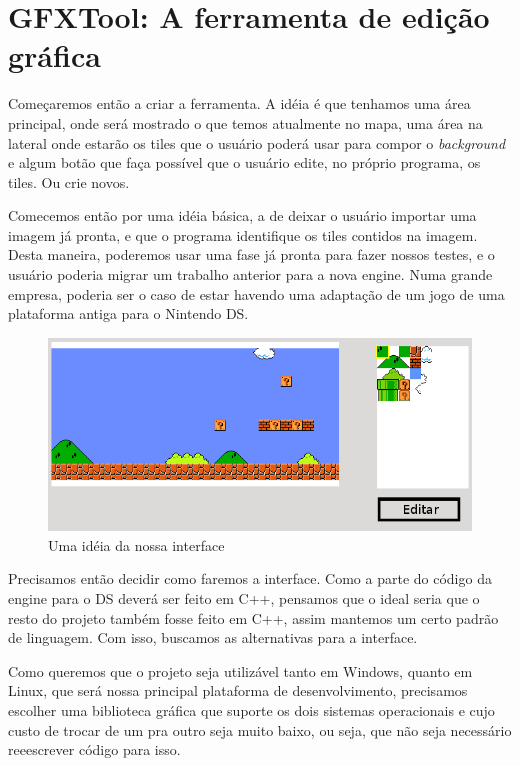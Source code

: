 \documentclass[brazil]{abnt}
\begin{document}
\section{GFXTool: A ferramenta de edição gráfica}
Começaremos então a criar a ferramenta. A idéia é que tenhamos uma área principal, onde será mostrado o que temos atualmente no mapa, uma área na lateral onde estarão os tiles que o usuário poderá usar para compor o \textit{background} e algum botão que faça possível que o usuário edite, no próprio programa, os tiles. Ou crie novos.

Comecemos então por uma idéia básica, a de deixar o usuário importar uma imagem já pronta, e que o programa identifique os tiles contidos na imagem. Desta maneira, poderemos usar uma fase já pronta para fazer nossos testes, e o usuário poderia migrar um trabalho anterior para a nova engine. Numa grande empresa, poderia ser o caso de estar havendo uma adaptação de um jogo de uma plataforma antiga para o Nintendo DS.

\begin{figure}[h]
\includegraphics[width=\linewidth]{imgs/mockup.png}
\caption{Uma idéia da nossa interface} 
\end{figure}

Precisamos então decidir como faremos a interface. Como a parte do código da engine para o DS deverá ser feito em C++, pensamos que o ideal seria que o resto do projeto também fosse feito em C++, assim mantemos um certo padrão de linguagem. Com isso, buscamos as alternativas para a interface.

Como queremos que o projeto seja utilizável tanto em Windows, quanto em Linux, que será nossa principal plataforma de desenvolvimento, precisamos escolher uma biblioteca gráfica que suporte os dois sistemas operacionais e cujo custo de trocar de um pra outro seja muito baixo, ou seja, que não seja necessário reeescrever código para isso.
\end{document}
